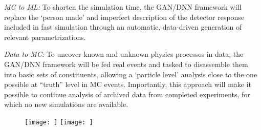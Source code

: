 \textit{MC to ML:} To shorten the simulation time, the GAN/DNN framework will replace the `person made' and imperfect description of the detector response included in fast simulation through an automatic, data-driven generation of relevant parametrizations.

\textit{Data to MC:} To uncover known and unknown physics processes in data, the GAN/DNN framework will be fed real events and tasked to disassemble them into basic sets of constituents, allowing a `particle level' analysis close to the one possible at ``truth'' level in MC events. Importantly, this approach will make it possible to continue analysis of archived data  from completed experiments, for which no new simulations are available.


\begin{figure}[!ht]
\vspace{-0.4cm}
\begin{center}
\texttt{[image: ]}
\hspace{0.03\textwidth}
\texttt{[image: ]}
\vspace{-0.5cm}
\caption{}
\label{fig:concept}
\end{center}
\end{figure}
\vspace{-0.8cm}

